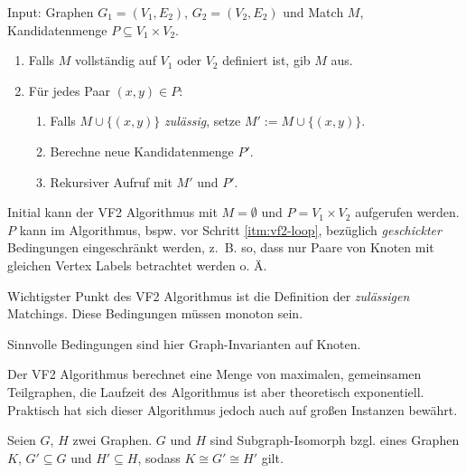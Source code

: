 \begin{definition}[VF2 Algorithmus]
    Input: Graphen $ G_1 = (V_1, E_2) $, $ G_2 = (V_2, E_2) $ und Match $ M $, Kandidatenmenge $ P \subseteq V_1 \times V_2 $.

    \begin{enumerate}
        \item Falls $ M $ vollständig auf $ V_1 $ oder $ V_2 $ definiert ist, gib $ M $ aus.
        \item \label{itm:vf2-loop}
        Für jedes Paar $ (x, y) \in P $:
        \begin{enumerate}
            \item Falls $ M \cup \{ (x, y) \} $ \textit{zulässig}, setze $ M' := M \cup \{ (x, y) \} $.
            \item Berechne neue Kandidatenmenge $ P' $.
            \item Rekursiver Aufruf mit $ M' $ und $ P' $.
        \end{enumerate}
    \end{enumerate}

    Initial kann der VF2 Algorithmus mit $ M = \emptyset $ und $ P = V_1 \times V_2 $ aufgerufen werden.
    $ P $ kann im Algorithmus, bspw. vor Schritt \ref{itm:vf2-loop}, bezüglich \textit{geschickter} Bedingungen eingeschränkt werden, z.~B. so, dass nur Paare von Knoten mit gleichen Vertex Labels betrachtet werden o. Ä.
\end{definition}

\begin{remark}
    Wichtigster Punkt des VF2 Algorithmus ist die Definition der \textit{zulässigen} Matchings.
    Diese Bedingungen müssen monoton sein.

    Sinnvolle Bedingungen sind hier Graph-Invarianten auf Knoten.
\end{remark}

\begin{remark}
    Der VF2 Algorithmus berechnet eine Menge von maximalen, gemeinsamen Teilgraphen, die Laufzeit des Algorithmus ist aber theoretisch exponentiell.
    Praktisch hat sich dieser Algorithmus jedoch auch auf großen Instanzen bewährt.
\end{remark}

\begin{definition}
    Seien $ G $, $ H $ zwei Graphen.
    $ G $ und $ H $ sind Subgraph-Isomorph bzgl. eines Graphen $ K $, $ G' \subseteq G $ und $ H' \subseteq H $, sodass $ K \cong G' \cong H' $ gilt.
\end{definition}

